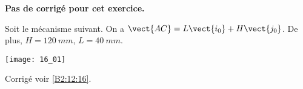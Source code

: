 \normalfalse \difficiletrue \tdifficilefalse
\correctionfalse


\setcounter{question}{0}
\ifcorrection
\else
\textbf{Pas de corrigé pour cet exercice.}
\fi

\ifprof
\else
Soit le mécanisme suivant. On a $\vect{AC}=L\vect{i_0}+H\vect{j_0}$. De plus, 
$H=\SI{120}{mm}$, $L=\SI{40}{mm}$.

\begin{center}
\texttt{[image: 16\_01]}
\end{center}
\fi


\ifprof
\else
\fi


\ifprof
\else
\fi

\ifprof
\else
\fi





\ifprof
\else
\begin{flushright}
\footnotesize{Corrigé  voir \ref{B2:12:16}.}
\end{flushright}%
\fi